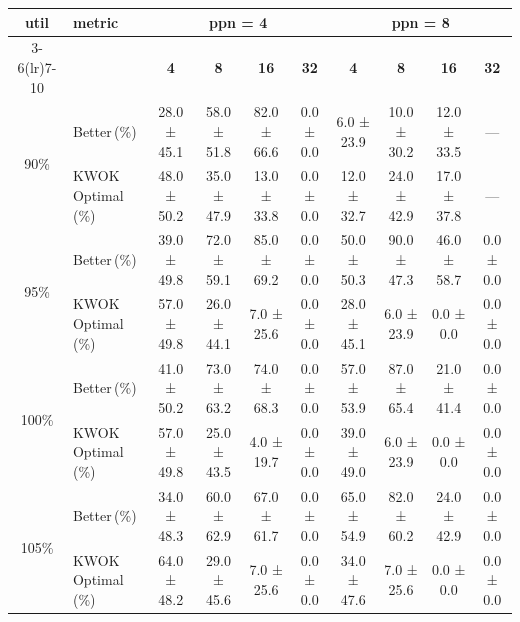 \begin{tabular}{@{}c l *{8}{c}@{}}
\toprule
\multirow{2}{*}{\textbf{util}} & \multirow{2}{*}{\textbf{metric}} &\multicolumn{4}{c}{\textbf{ppn = 4}} & \multicolumn{4}{c}{\textbf{ppn = 8}}\\
\cmidrule(lr){3-6}\cmidrule(lr){7-10}
 &  & \textbf{4} & \textbf{8} & \textbf{16} & \textbf{32} & \textbf{4} & \textbf{8} & \textbf{16} & \textbf{32}\\
\midrule
\multirow{2}{*}{90\%}
& Better\,(\%) & 28.0 ± 45.1 & 58.0 ± 51.8 & 82.0 ± 66.6 & 0.0 ± 0.0 & 6.0 ± 23.9 & 10.0 ± 30.2 & 12.0 ± 33.5 & \multicolumn{1}{c}{—} \\
& KWOK\,Optimal\,(\%) & 48.0 ± 50.2 & 35.0 ± 47.9 & 13.0 ± 33.8 & 0.0 ± 0.0 & 12.0 ± 32.7 & 24.0 ± 42.9 & 17.0 ± 37.8 & \multicolumn{1}{c}{—} \\
\midrule
\multirow{2}{*}{95\%}
& Better\,(\%) & 39.0 ± 49.8 & 72.0 ± 59.1 & 85.0 ± 69.2 & 0.0 ± 0.0 & 50.0 ± 50.3 & 90.0 ± 47.3 & 46.0 ± 58.7 & 0.0 ± 0.0 \\
& KWOK\,Optimal\,(\%) & 57.0 ± 49.8 & 26.0 ± 44.1 & 7.0 ± 25.6 & 0.0 ± 0.0 & 28.0 ± 45.1 & 6.0 ± 23.9 & 0.0 ± 0.0 & 0.0 ± 0.0 \\
\midrule
\multirow{2}{*}{100\%}
& Better\,(\%) & 41.0 ± 50.2 & 73.0 ± 63.2 & 74.0 ± 68.3 & 0.0 ± 0.0 & 57.0 ± 53.9 & 87.0 ± 65.4 & 21.0 ± 41.4 & 0.0 ± 0.0 \\
& KWOK\,Optimal\,(\%) & 57.0 ± 49.8 & 25.0 ± 43.5 & 4.0 ± 19.7 & 0.0 ± 0.0 & 39.0 ± 49.0 & 6.0 ± 23.9 & 0.0 ± 0.0 & 0.0 ± 0.0 \\
\midrule
\multirow{2}{*}{105\%}
& Better\,(\%) & 34.0 ± 48.3 & 60.0 ± 62.9 & 67.0 ± 61.7 & 0.0 ± 0.0 & 65.0 ± 54.9 & 82.0 ± 60.2 & 24.0 ± 42.9 & 0.0 ± 0.0 \\
& KWOK\,Optimal\,(\%) & 64.0 ± 48.2 & 29.0 ± 45.6 & 7.0 ± 25.6 & 0.0 ± 0.0 & 34.0 ± 47.6 & 7.0 ± 25.6 & 0.0 ± 0.0 & 0.0 ± 0.0 \\
\bottomrule
\end{tabular}
